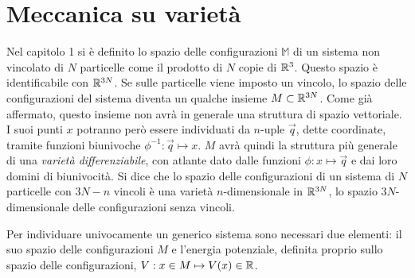 \section{Meccanica su varietà}
Nel capitolo 1 si è definito lo spazio delle configurazioni $\mathbb{M}$ di un sistema non vincolato di $N$ particelle come il prodotto di $N$ copie di $\mathbb{R}^{3}$. Questo spazio è identificabile con $\mathbb{R}^{3N}$. Se sulle particelle viene imposto un vincolo, lo spazio delle configurazioni del sistema diventa un qualche insieme $M \subset \mathbb{R}^{3N}$. Come già affermato, questo insieme non avrà in generale una struttura di spazio vettoriale. I suoi punti $x$ potranno però essere individuati da $n$-uple $\vec{q}$, dette coordinate, tramite funzioni biunivoche $\phi^{-1}: \vec{q} \mapsto x$. $M$ avrà quindi la struttura più generale di una \emph{varietà differenziabile}, con atlante dato dalle funzioni $\phi: x \mapsto \vec{q}$ e dai loro domini di biunivocità. Si dice che lo spazio delle configurazioni di un sistema di $N$ particelle con $3N-n$ vincoli è una varietà $n$-dimensionale  in $\mathbb{R}^{3N}$, lo spazio $3N$-dimensionale delle configurazioni senza vincoli.

Per individuare univocamente un generico sistema sono necessari due elementi: il suo spazio delle configurazioni $M$ e l'energia potenziale, definita proprio sullo spazio delle configurazioni, $V: x \in M \mapsto V(x) \in \mathbb{R}$.  


